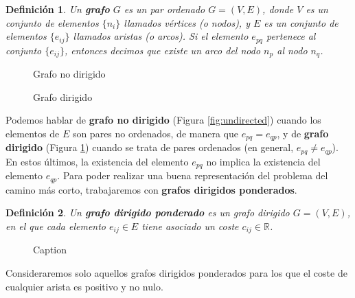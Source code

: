 \documentclass[a4paper,12pt]{article}
\newtheorem{defn}{Definición}
\begin{document}
\begin{defn}\label{def1}
Un \textbf{grafo} $G$ es un par ordenado $G=(V,E)$, donde $V$ es un conjunto de elementos $\{n_i\}$ llamados vértices (o nodos), y $E$ es un conjunto de elementos $\{e_{ij}\}$ llamados aristas (o arcos). Si el elemento $e_{pq}$ pertenece al conjunto $\{e_{ij}\}$, entonces decimos que existe un arco del nodo $n_p$ al nodo $n_q$.
\end{defn}

\begin{figure}[H]
    \centering
    \begin{minipage}{0.47\textwidth}
        \centering
        
        \caption{Grafo no dirigido}
        \label{fig:undirected}
    \end{minipage}
    \begin{minipage}{0.47\textwidth}
        \centering
        
        \caption{Grafo dirigido}
        \label{fig:directed}
    \end{minipage}
\end{figure}

\noindent Podemos hablar de \textbf{grafo no dirigido} (Figura \ref{fig:undirected}) cuando los elementos de $E$ son pares no ordenados, de manera que $e_{pq}=e_{qp}$, y de \textbf{grafo dirigido} (Figura \ref{fig:directed}) cuando se trata de pares ordenados (en general, $e_{pq} \neq e_{qp}$). En estos últimos, la existencia del elemento $e_{pq}$ no implica la existencia del elemento $e_{qp}$. Para poder realizar una buena representación del problema del camino más corto, trabajaremos con \textbf{grafos dirigidos ponderados}.

\begin{defn}
Un \textbf{grafo dirigido ponderado} es un grafo dirigido $G=(V,E)$, en el que cada elemento $e_{ij}\in E$ tiene asociado un coste $c_{ij} \in \mathbb{R}$.
\end{defn}

\begin{figure}
    \centering
    
    \caption{Caption}
    \label{fig:weighted}
\end{figure}

\noindent Consideraremos solo aquellos grafos dirigidos ponderados para los que el coste de cualquier arista es positivo y no nulo.
\end{document}
